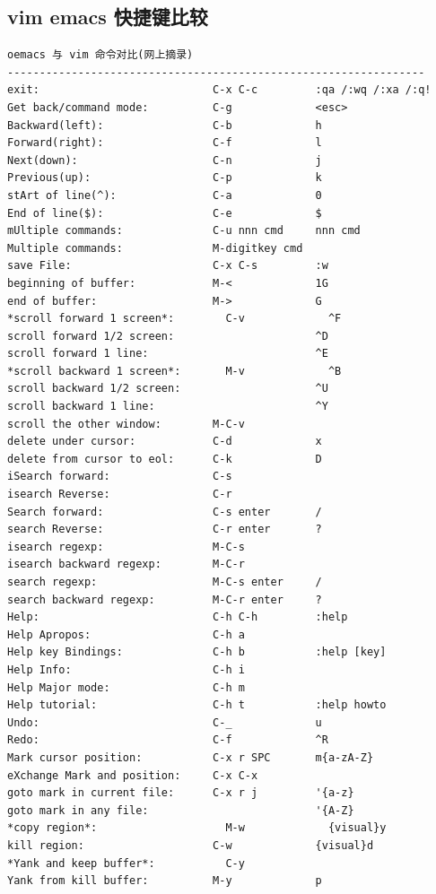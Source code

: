 \documentclass[11pt]{article}
\begin{document}
\subsection{vim emacs 快捷键比较}
\label{sec:org23b8337}
\begin{verbatim}
oemacs 与 vim 命令对比(网上摘录)
-----------------------------------------------------------------
exit:                           C-x C-c         :qa /:wq /:xa /:q!
Get back/command mode:          C-g             <esc>
Backward(left):                 C-b             h
Forward(right):                 C-f             l
Next(down):                     C-n             j
Previous(up):                   C-p             k
stArt of line(^):               C-a             0
End of line($):                 C-e             $
mUltiple commands:              C-u nnn cmd     nnn cmd
Multiple commands:              M-digitkey cmd
save File:                      C-x C-s         :w
beginning of buffer:            M-<             1G
end of buffer:                  M->             G
*scroll forward 1 screen*:        C-v             ^F
scroll forward 1/2 screen:                      ^D
scroll forward 1 line:                          ^E
*scroll backward 1 screen*:       M-v             ^B
scroll backward 1/2 screen:                     ^U
scroll backward 1 line:                         ^Y
scroll the other window:        M-C-v
delete under cursor:            C-d             x
delete from cursor to eol:      C-k             D
iSearch forward:                C-s
isearch Reverse:                C-r
Search forward:                 C-s enter       /
search Reverse:                 C-r enter       ?
isearch regexp:                 M-C-s
isearch backward regexp:        M-C-r
search regexp:                  M-C-s enter     /
search backward regexp:         M-C-r enter     ?
Help:                           C-h C-h         :help
Help Apropos:                   C-h a
Help key Bindings:              C-h b           :help [key]
Help Info:                      C-h i
Help Major mode:                C-h m
Help tutorial:                  C-h t           :help howto
Undo:                           C-_             u
Redo:                           C-f             ^R
Mark cursor position:           C-x r SPC       m{a-zA-Z}
eXchange Mark and position:     C-x C-x
goto mark in current file:      C-x r j         '{a-z}
goto mark in any file:                          '{A-Z}
*copy region*:                    M-w             {visual}y
kill region:                    C-w             {visual}d
*Yank and keep buffer*:           C-y
Yank from kill buffer:          M-y             p

\end{verbatim}
\end{document}
